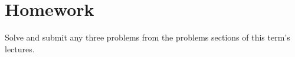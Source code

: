 \documentclass{article}
\begin{document}
\section{Homework}
  Solve and submit any three problems from the problems sections of this term's
  lectures.
\newpage
\end{document}
